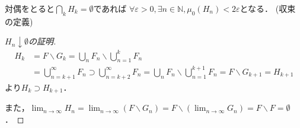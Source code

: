 \documentclass{jsarticle}
\begin{document}
\begin{itembox}{}
    対偶をとると$\bigcap_k H_k = \emptyset$であれば
    $\forall\varepsilon >0,\exists n\in\mathbb{N},\mu_0(H_n)<2\varepsilon$となる．
    (収束の定義)
\end{itembox}

\begin{itembox}{}
    \begin{proof}[\rm $H_n\downarrow\emptyset$の証明]{}
        \begin{align}
            H_k&=F\backslash G_k=\bigcup_n F_n\backslash\bigcup_{n=1}^k F_n \nonumber \\
            &=\bigcup_{n=k+1}^{\infty} F_n \supset \bigcup_{n=k+2}^{\infty} F_n =\bigcup_n F_n\backslash\bigcup_{n=1}^{k+1} F_n =F\backslash G_{k+1} = H_{k+1} \nonumber
        \end{align}
        より$H_k\supset H_{k+1}$．
        
        また，$\lim_{n\to\infty} H_n =\lim_{n\to\infty} (F\backslash G_n) =F\backslash (\lim_{n\to\infty} G_n)=F\backslash F=\emptyset$．
    \end{proof}
\end{itembox}
\end{document}

